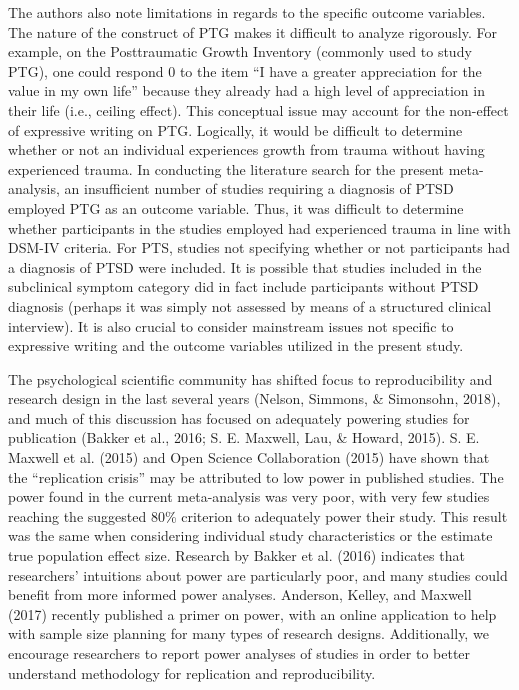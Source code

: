 \documentclass[man, mask]{apa6}
\newcounter{author}
\theoremstyle{definition}
\theoremstyle{definition}
\theoremstyle{definition}
\theoremstyle{remark}
\begin{document}
The authors also note limitations in regards to the specific outcome
variables. The nature of the construct of PTG makes it difficult to
analyze rigorously. For example, on the Posttraumatic Growth Inventory
(commonly used to study PTG), one could respond 0 to the item \enquote{I
have a greater appreciation for the value in my own life} because they
already had a high level of appreciation in their life (i.e., ceiling
effect). This conceptual issue may account for the non-effect of
expressive writing on PTG. Logically, it would be difficult to determine
whether or not an individual experiences growth from trauma without
having experienced trauma. In conducting the literature search for the
present meta-analysis, an insufficient number of studies requiring a
diagnosis of PTSD employed PTG as an outcome variable. Thus, it was
difficult to determine whether participants in the studies employed had
experienced trauma in line with DSM-IV criteria. For PTS, studies not
specifying whether or not participants had a diagnosis of PTSD were
included. It is possible that studies included in the subclinical
symptom category did in fact include participants without PTSD diagnosis
(perhaps it was simply not assessed by means of a structured clinical
interview). It is also crucial to consider mainstream issues not
specific to expressive writing and the outcome variables utilized in the
present study.

The psychological scientific community has shifted focus to
reproducibility and research design in the last several years (Nelson,
Simmons, \& Simonsohn, 2018), and much of this discussion has focused on
adequately powering studies for publication (Bakker et al., 2016; S. E.
Maxwell, Lau, \& Howard, 2015). S. E. Maxwell et al. (2015) and Open
Science Collaboration (2015) have shown that the \enquote{replication
crisis} may be attributed to low power in published studies. The power
found in the current meta-analysis was very poor, with very few studies
reaching the suggested 80\% criterion to adequately power their study.
This result was the same when considering individual study
characteristics or the estimate true population effect size. Research by
Bakker et al. (2016) indicates that researchers' intuitions about power
are particularly poor, and many studies could benefit from more informed
power analyses. Anderson, Kelley, and Maxwell (2017) recently published
a primer on power, with an online application to help with sample size
planning for many types of research designs. Additionally, we encourage
researchers to report power analyses of studies in order to better
understand methodology for replication and reproducibility.
\end{document}

